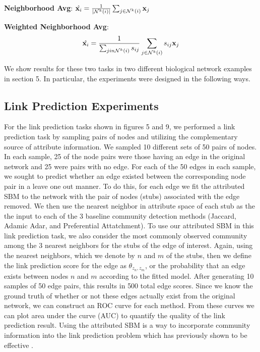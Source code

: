 \documentclass[journal]{IEEEtran}
\begin{document}
{\bf Neighborhood Avg}: $\hat{{\bf x}_{i}}= \frac{1}{|\mathcal{N}^{k}(i)|}\sum_{j \in \mathcal{N}^{k}(i)} {\bf x}_{j}$

{\bf Weighted Neighborhood Avg}: \[\hat{{\bf x}_{i}}=\frac{1}{\sum_{j in \mathcal{N}^{k}(i)}s_{ij}}\sum_{j \in \mathcal{N}^{k}(i)}s_{ij}{\bf x}_{j}\]

We show results for these two tasks in two different biological network examples in section 5. In particular, the experiments were designed in the following ways.

\subsection{Link Prediction Experiments}
For the link prediction tasks shown in figures 5 and 9, we performed a link prediction task by sampling pairs of nodes and utilizing the complementary source of attribute information. We sampled 10 different sets of 50 pairs of nodes. In each sample, 25 of the node pairs were those having an edge in the original network and 25 were pairs with no edge. For each of the 50 edges in each sample, we sought to predict whether an edge existed between the corresponding node pair in a leave one out manner. To do this, for each edge we fit the attributed SBM to the network with the pair of nodes (stubs) associated with the edge removed. We then use the nearest neighbor in attribute space of each stub as the the input to each of the 3 baseline community detection methods (Jaccard, Adamic Adar, and Preferential Attatchment). To use our attributed SBM in this link prediction task, we also consider the most commonly observed community among the 3 nearest neighbors for the stubs of the edge of interest. Again, using the nearest neighbors, which we denote by $n$ and $m$ of the stubs, then we define the link prediction score for the edge as $\theta_{z_{n},z_{m}}$, or the probability that an edge exists between nodes $n$ and $m$ according to the fitted model. After generating 10 samples of 50 edge pairs, this results in 500 total edge scores. Since we know the ground truth of whether or not these edges actually exist from the original network, we can construct an ROC curve for each method. From these curves we can plot area under the curve (AUC) to quantify the quality of the link prediction result. Using the attributed SBM is a way to incorporate community information into the link prediction problem which has previously shown to be effective \cite{linkComm}.
\end{document}
